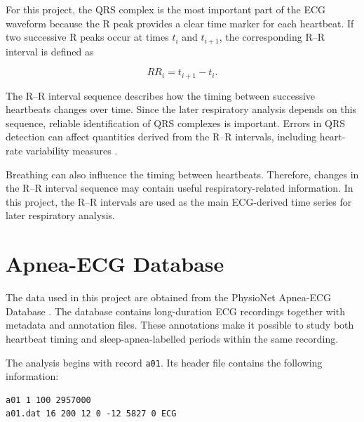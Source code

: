 \documentclass[a4paper,10.5pt,oneside]{report}
\begin{document}
For this project, the QRS complex is the most important part of the ECG waveform
because the R peak provides a clear time marker for each heartbeat. If two
successive R peaks occur at times $t_i$ and $t_{i+1}$, the corresponding
R--R interval is defined as

\begin{equation}
RR_i = t_{i+1} - t_i.
\end{equation}

The R--R interval sequence describes how the timing between successive
heartbeats changes over time. Since the later respiratory analysis depends on
this sequence, reliable identification of QRS complexes is important. Errors in
QRS detection can affect quantities derived from the R--R intervals, including
heart-rate variability measures \cite{weinstein2026}.

Breathing can also influence the timing between heartbeats. Therefore, changes
in the R--R interval sequence may contain useful respiratory-related
information. In this project, the R--R intervals are used as the main
ECG-derived time series for later respiratory analysis.

%

\section{Apnea-ECG Database}

The data used in this project are obtained from the PhysioNet Apnea-ECG
Database \cite{penzel2000}. The database contains long-duration ECG recordings
together with metadata and annotation files. These annotations make it possible
to study both heartbeat timing and sleep-apnea-labelled periods within the same
recording.

The analysis begins with record \texttt{a01}. Its header file contains the
following information:

\begin{verbatim}
a01 1 100 2957000
a01.dat 16 200 12 0 -12 5827 0 ECG
\end{verbatim}
\end{document}

